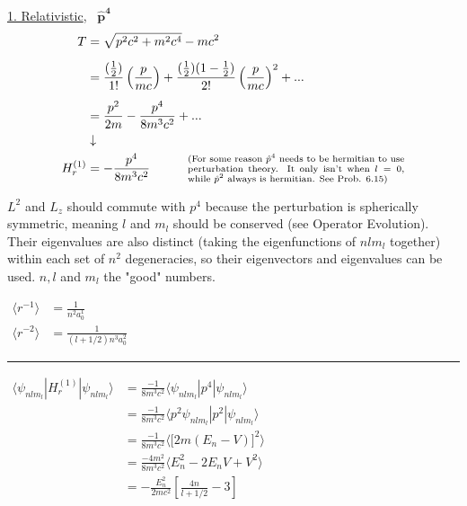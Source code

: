 \documentclass[12pt]{article}
\begin{document}
\vspace{15pt}\noindent
\underline{1. Relativistic}, \ \(\boldsymbol{\hat{p}^4}\)
\begin{align*}
    T &= \sqrt{p^2c^2 + m^2c^4} - mc^2 \\[5pt]
    &= \frac{ (\tfrac{1}{2}) }{1!} \left( \frac{p}{mc} \right) 
        + \frac{ (\tfrac{1}{2}) (1 - \tfrac{1}{2}) }{2!} \left( \frac{p}{mc} \right)^2  + ...\\[5pt]
    &= \frac{p^2}{2m} - \frac{p^4}{8 m^3 c^2} + ...\\
    &\downarrow\\
    H^{(1)}_r &= - \frac{p^4}{8 m^3 c^2} \indent \indent
        \begin{minipage}{.5\textwidth}
            \scriptsize(For some reason \(\hat{p}^4\) needs to be hermitian to use perturbation theory. 
            It only isn't when \(l=0\), while \(\hat{p}^2\) always is hermitian. See Prob. 6.15)    
        \end{minipage}
\end{align*}

\vspace{5pt} \noindent
\(L^2\) and \(L_z\) should commute with \(p^4\) because the perturbation is spherically symmetric, meaning 
\(l\) and \(m_l\) should be conserved (see Operator Evolution). Their eigenvalues are also distinct 
(taking the eigenfunctions of \(nlm_l\) together) within each set of \(n^2\) degeneracies, so their eigenvectors and 
eigenvalues can be used. \(n, l\) and \(m_l\) the "good" numbers.

\vspace{10pt}
\(\begin{aligned}
    \langle r^{-1} \rangle &= \tfrac{1}{n^2 a_0^1 }\\[5pt]
    \langle r^{-2} \rangle &= \tfrac{1}{ (l + 1/2) n^3 a_0^2 }
\end{aligned}\)
\hspace{10pt}
\rule[-85pt]{.5pt}{170pt}
\hspace{10pt}
\(\begin{aligned}
    \langle \psi_{nlm_l} | H^{(1)}_r | \psi_{nlm_l} \Big\rangle 
        &= \frac{- 1}{8 m^3 c^2} \langle \psi_{nlm_l} | p^4 | \psi_{nlm_l} \rangle\\[5pt]
    &= \frac{- 1}{8 m^3 c^2} \langle p^2 \psi_{nlm_l} | p^2 | \psi_{nlm_l} \rangle\\[5pt]
    &= \frac{- 1}{8 m^3 c^2} \Big\langle \big[ 2m(E_n-V) \big]^2 \Big\rangle\\[5pt]
    &= \frac{- 4m^2}{8 m^3 c^2} \langle E_n^2 -2E_nV + V^2 \rangle\\[5pt]
    &= - \frac{E_n^2}{2mc^2} \left[ \frac{4n}{l + 1/2} - 3\right]
\end{aligned}\)
\end{document}
